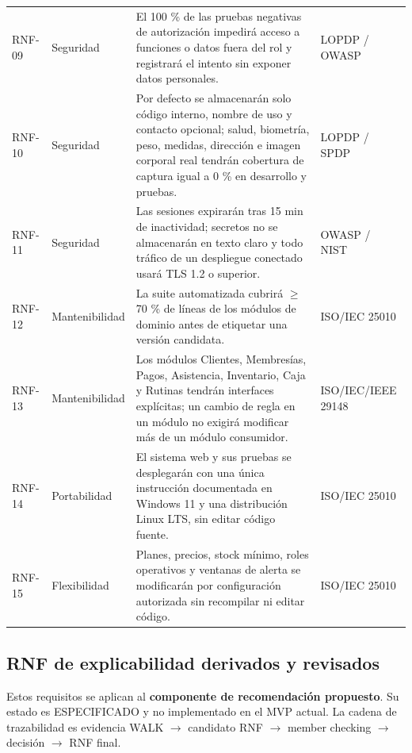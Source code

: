 \documentclass[11pt,a4paper,twoside]{article}
\begin{document}
\begin{landscape}
\begin{longtable}{p{2.4cm}p{3.2cm}p{10.0cm}p{4.0cm}}
RNF-09 & Seguridad & El 100 \% de las pruebas negativas de autorización impedirá acceso a funciones o datos fuera del rol y registrará el intento sin exponer datos personales. & LOPDP / OWASP \\
RNF-10 & Seguridad & Por defecto se almacenarán solo código interno, nombre de uso y contacto opcional; salud, biometría, peso, medidas, dirección e imagen corporal real tendrán cobertura de captura igual a 0 \% en desarrollo y pruebas. & LOPDP / SPDP \\
RNF-11 & Seguridad & Las sesiones expirarán tras 15 min de inactividad; secretos no se almacenarán en texto claro y todo tráfico de un despliegue conectado usará TLS 1.2 o superior. & OWASP / NIST \\
RNF-12 & Mantenibilidad & La suite automatizada cubrirá $\geq$ 70 \% de líneas de los módulos de dominio antes de etiquetar una versión candidata. & ISO/IEC 25010 \\
RNF-13 & Mantenibilidad & Los módulos Clientes, Membresías, Pagos, Asistencia, Inventario, Caja y Rutinas tendrán interfaces explícitas; un cambio de regla en un módulo no exigirá modificar más de un módulo consumidor. & ISO/IEC/IEEE 29148 \\
RNF-14 & Portabilidad & El sistema web y sus pruebas se desplegarán con una única instrucción documentada en Windows 11 y una distribución Linux LTS, sin editar código fuente. & ISO/IEC 25010 \\
RNF-15 & Flexibilidad & Planes, precios, stock mínimo, roles operativos y ventanas de alerta se modificarán por configuración autorizada sin recompilar ni editar código. & ISO/IEC 25010 \\
\bottomrule\end{longtable}
\end{landscape}

\subsection{RNF de explicabilidad derivados y revisados}
Estos requisitos se aplican al \textbf{componente de recomendación propuesto}. Su estado es ESPECIFICADO y no implementado en el MVP actual. La cadena de trazabilidad es evidencia WALK $\rightarrow$ candidato RNF $\rightarrow$ member checking $\rightarrow$ decisión $\rightarrow$ RNF final.
\end{document}
